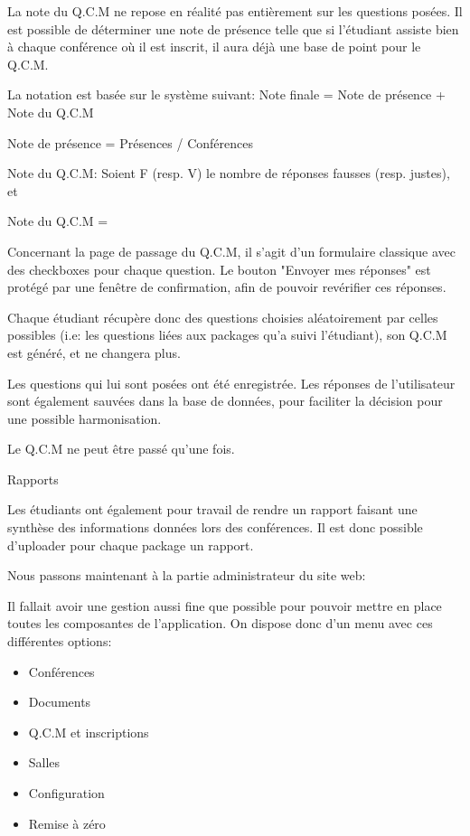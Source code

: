     La note du Q.C.M ne repose en réalité pas entièrement sur les questions posées. Il est possible de déterminer une note de présence
    telle que si l'étudiant assiste bien à chaque conférence où il est inscrit, il aura déjà une base de point pour le Q.C.M.

    La notation est basée sur le système suivant:
    Note finale = Note de présence + Note du Q.C.M

        Note de présence = Présences / Conférences

    Note du Q.C.M:
        Soient F (resp. V) le nombre de réponses fausses (resp. justes), et 

    Note du Q.C.M = 

    Concernant la page de passage du Q.C.M, il s'agit d'un formulaire classique avec des checkboxes pour chaque question.
    Le bouton "Envoyer mes réponses" est protégé par une fenêtre de confirmation, afin de pouvoir revérifier ces réponses.

    Chaque étudiant récupère donc des questions choisies aléatoirement par celles possibles (i.e: les questions liées aux packages qu'a
    suivi l'étudiant), son Q.C.M est généré, et ne changera plus.

    Les questions qui lui sont posées ont été enregistrée. Les réponses de l'utilisateur sont également sauvées dans la base de données,
    pour faciliter la décision pour une possible harmonisation.

    Le Q.C.M ne peut être passé qu'une fois.

    Rapports

    Les étudiants ont également pour travail de rendre un rapport faisant une synthèse des informations données lors des conférences.
    Il est donc possible d'uploader pour chaque package un rapport.

    Nous passons maintenant à la partie administrateur du site web:

    Il fallait avoir une gestion aussi fine que possible pour pouvoir mettre en place toutes les composantes de l'application.
    On dispose donc d'un menu avec ces différentes options:

    \begin{itemize}
    \item Conférences
    \item Documents
    \item Q.C.M et inscriptions
    \item Salles
    \item Configuration
    \item Remise à zéro
    \end{itemize}

